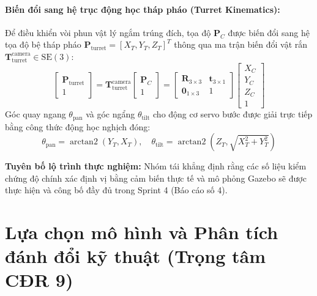\documentclass[12pt,a4paper]{article}
\begin{document}
\paragraph{Biến đổi sang hệ trục động học tháp pháo (Turret Kinematics):}
Để điều khiển vòi phun vật lý ngắm trúng đích, tọa độ $\mathbf{P}_C$ được biến đổi sang hệ tọa độ bệ tháp pháo $\mathbf{P}_{\text{turret}} = [X_T, Y_T, Z_T]^T$ thông qua ma trận biến đổi vật rắn $\mathbf{T}_{\text{turret}}^{\text{camera}} \in \mathrm{SE}(3)$:
\begin{equation}
\begin{bmatrix} \mathbf{P}_{\text{turret}} \\ 1 \end{bmatrix} = \mathbf{T}_{\text{turret}}^{\text{camera}} \begin{bmatrix} \mathbf{P}_C \\ 1 \end{bmatrix} = \begin{bmatrix} \mathbf{R}_{3 \times 3} & \mathbf{t}_{3 \times 1} \\ \mathbf{0}_{1 \times 3} & 1 \end{bmatrix} \begin{bmatrix} X_C \\ Y_C \\ Z_C \\ 1 \end{bmatrix}
\end{equation}
Góc quay ngang $\theta_{\text{pan}}$ và góc ngẩng $\theta_{\text{tilt}}$ cho động cơ servo bước được giải trực tiếp bằng công thức động học nghịch đóng:
\begin{equation}
\theta_{\text{pan}} = \operatorname{arctan2}(Y_T, X_T), \quad \theta_{\text{tilt}} = \operatorname{arctan2}\left(Z_T, \sqrt{X_T^2 + Y_T^2}\right)
\end{equation}

\noindent\textbf{Tuyên bố lộ trình thực nghiệm:}
Nhóm tái khẳng định rằng các số liệu kiểm chứng độ chính xác định vị bằng cảm biến thực tế và mô phỏng Gazebo sẽ được thực hiện và công bố đầy đủ trong Sprint 4 (Báo cáo số 4).

\section{Lựa chọn mô hình và Phân tích đánh đổi kỹ thuật (Trọng tâm CĐR 9)}
\end{document}
